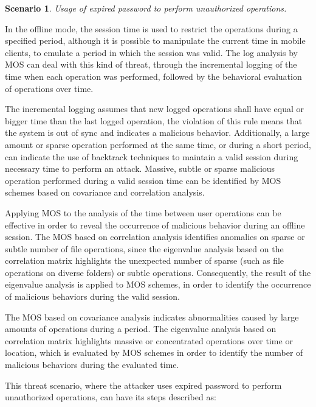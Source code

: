 \documentclass[twocolumn]{svjour3}          	%
\newtheorem{thm}{Scenario}
\begin{document}
\begin{thm}
Usage of expired password to perform unauthorized operations.
\end{thm}

In the offline mode, the session time is used to restrict the operations during a specified period, although it is possible to manipulate the current time in mobile clients, to emulate a period in which the session was valid. The log analysis by MOS can deal with this kind of threat, through the incremental logging of the time when each operation was performed, followed by the behavioral evaluation of operations over time. 

The incremental logging assumes that new logged operations shall have equal or bigger time than the last logged operation, the violation of this rule means that the system is out of sync and indicates a malicious behavior. Additionally, a large amount or sparse operation performed at the same time, or during a short period, can indicate the use of backtrack techniques to maintain a valid session during necessary time to perform an attack. Massive, subtle or sparse malicious operation performed during a valid session time can be identified by MOS schemes based on covariance and correlation analysis.

Applying MOS to the analysis of the time between user operations can be effective in order to reveal the occurrence of malicious behavior during an offline session. The MOS based on correlation analysis identifies anomalies on sparse or subtle number of file operations, since the eigenvalue analysis based on the correlation matrix highlights the unexpected number of sparse (such as file operations on diverse folders) or subtle operations. Consequently, the result of the eigenvalue analysis is applied to MOS schemes, in order to identify the occurrence of malicious behaviors during the valid session.

The MOS based on covariance analysis indicates abnormalities caused by large amounts of operations during a period. The eigenvalue analysis based on correlation matrix highlights massive or concentrated operations over time or location, which is evaluated by MOS schemes in order to identify the number of malicious behaviors during the evaluated time.

This threat scenario, where the attacker uses expired password to perform unauthorized operations, can have its steps described as:
\end{document}
